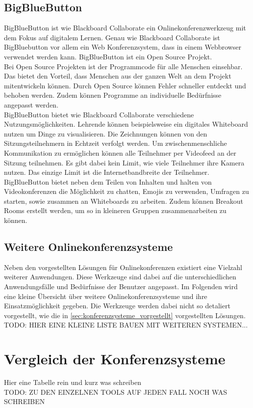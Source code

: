 \subsection{BigBlueButton}
BigBlueButton ist wie Blackboard Collaborate ein Onlinekonferenzwerkzeug mit dem Fokus auf digitalem Lernen.
Genau wie Blackboard Collaborate ist BigBluebutton vor allem ein Web Konferenzsystem, dass in einem Webbrowser verwendet werden kann.
BigBlueButton ist ein Open Source Projekt.
\autocite[Vgl.][]{M_BigBlueButton.o.J.b}
\\
Bei Open Source Projekten ist der Programmcode für alle Menschen einsehbar.
Das bietet den Vorteil, dass Menschen aus der ganzen Welt an dem Projekt mitentwickeln können.
Durch Open Source können Fehler schneller entdeckt und behoben werden.
Zudem können Programme an individuelle Bedürfnisse angepasst werden.
\autocite[Vgl.][]{M_RedHat.o.J.}
\\
BigBlueButton bietet wie Blackboard Collaborate verschiedene Nutzungsmöglichkeiten.
Lehrende können beispielsweise ein digitales Whiteboard nutzen um Dinge zu visualisieren.
Die Zeichnungen können von den Sitzungsteilnehmern in Echtzeit verfolgt werden.
Um zwischenmenschliche Kommunikation zu ermöglichen können alle Teilnehmer per Videofeed an der Sitzung teilnehmen.
Es gibt dabei kein Limit, wie viele Teilnehmer ihre Kamera nutzen. Das einzige Limit ist die Internetbandbreite der Teilnehmer.
\autocite[Vgl.][]{M_BigBlueButton.o.J.}
\\
BigBlueButton bietet neben dem Teilen von Inhalten und halten von Videokonferenzen die Möglichkeit zu chatten, Emojis zu verwenden, Umfragen zu starten, sowie zusammen an Whiteboards zu arbeiten.
Zudem können Breakout Rooms erstellt werden, um so in kleineren Gruppen zusammenarbeiten zu können.
\autocite[Vgl.][]{M_BigBlueButton.o.J.}
\\

\subsection{Weitere Onlinekonferenzsysteme}
Neben den vorgestellten Lösungen für Onlinekonferenzen existiert eine Vielzahl weiterer Anwendungen.
Diese Werkzeuge sind dabei auf die unterschiedlichen Anwendungsfälle und Bedürfnisse der Benutzer angepasst.
Im Folgenden wird eine kleine Übersicht über weitere Onlinekonferenzsysteme und ihre Einsatzmöglichkeit gegeben.
Die Werkzeuge werden dabei nicht so detaliert vorgestellt, wie die in \autoref{sec:konferenzsysteme_vorgestellt} vorgestellten Lösungen.
\\
TODO: HIER EINE KLEINE LISTE BAUEN MIT WEITEREN SYSTEMEN...

\section{Vergleich der Konferenzsysteme}
Hier eine Tabelle rein und kurz was schreiben\\
TODO: ZU DEN EINZELNEN TOOLS AUF JEDEN FALL NOCH WAS SCHREIBEN